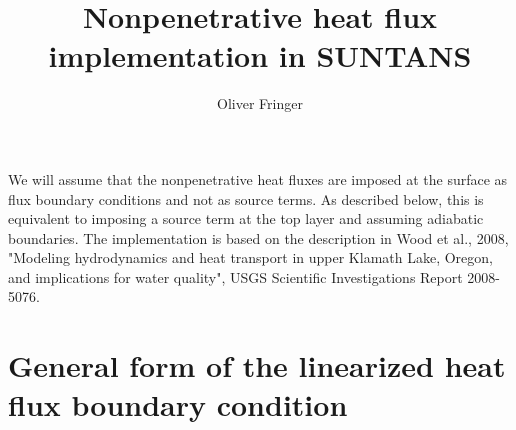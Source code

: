 \documentclass[12pt]{article}
\begin{document}
\title{Nonpenetrative heat flux implementation in SUNTANS}

\author{Oliver Fringer}

\maketitle

We will assume that the nonpenetrative heat fluxes are imposed at the surface
as flux boundary conditions and not as source terms. As described below,
this is equivalent to imposing a source term at the top layer and assuming
adiabatic boundaries.  The implementation 
is based on the description in Wood et al., 2008, 
"Modeling hydrodynamics and heat transport in upper Klamath Lake, Oregon, 
and implications for water quality", USGS Scientific Investigations 
Report 2008-5076.

\section{General form of the linearized heat flux boundary condition}
\end{document}
